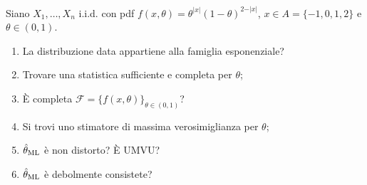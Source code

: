 \documentclass[hidelinks, 10pt]{report}
\begin{document}
\begin{ex}
Siano $ X_{1}, \dotsc, X_{n} $ i.i.d. con pdf $ f(x, \theta) = \theta^{\vert x \vert} (1 - \theta)^{2 - \vert x \vert} $, $ x \in A = \{ -1, 0, 1, 2 \} $ e $ \theta \in (0, 1) $.

\begin{enumerate}
\item La distribuzione data appartiene alla famiglia esponenziale?
\item Trovare una statistica sufficiente e completa per $ \theta $;
\item \`E completa $ \mathcal{F} = \{ f(x, \theta) \}_{\theta \in (0, 1)} $?
\item Si trovi uno stimatore di massima verosimiglianza per $ \theta $;
\item $ \hat{\theta}_{\text{ML}} $ \`e non distorto? \`E UMVU?
\item $ \hat{\theta}_{\text{ML}} $ \`e debolmente consistete?
\end{enumerate}
\end{ex}
\end{document}
